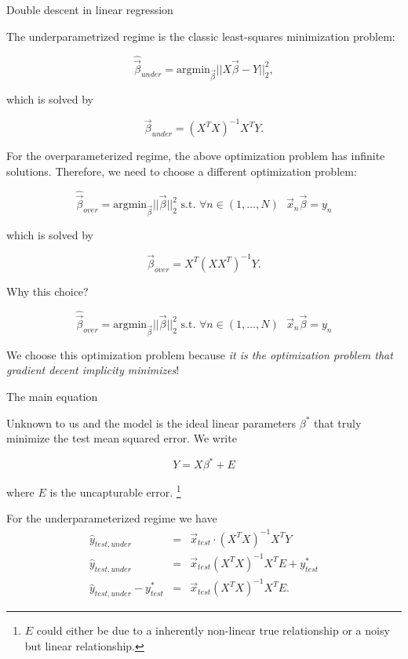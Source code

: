 \documentclass{beamer}
\begin{document}
\begin{frame}{Double descent in linear regression}

    The underparametrized regime is the classic least-squares minimization problem:

    $$\hat{\vec{\beta}}_{under} = \text{arg} \text{min}_{\vec{\beta}}||X \vec{\beta} - Y||^2_2, $$

    which is solved by

    $$\vec{\beta}_{under} = (X^T X)^{-1} X^T Y.$$

    \pause

    For the overparameterized regime, the above optimization problem has infinite solutions. Therefore, we need to choose a different optimization problem:

    $$\hat{\vec{\beta}}_{over} = \text{arg} \text{min}_{\vec{\beta}}||\vec{\beta}||^2_2 \text{   s.t.   } \forall n \in (1,\dots,N) \text{   } \vec{x}_n \vec{\beta} = y_n$$

    which is solved by

    $$\vec{\beta}_{over} = X^T (X X^T)^{-1}Y.$$

\end{frame}


\begin{frame}{Why this choice?}

    $$\hat{\vec{\beta}}_{over} = \text{arg} \text{min}_{\vec{\beta}}||\vec{\beta}||^2_2 \text{   s.t.   } \forall n \in (1,\dots,N) \text{   } \vec{x}_n \vec{\beta} = y_n$$

    \hspace{5cm}

    We choose this optimization problem because \emph{it is the optimization problem that gradient decent implicity minimizes}!
    
\end{frame}

\begin{frame}{The main equation}

    Unknown to us and the model is the ideal linear parameters $\beta^*$ that truly minimize the test mean squared error. We write 

    $$Y=X\beta^* + E$$

    where $E$ is the uncapturable error. \footnote{$E$ could either be due to a inherently non-linear true relationship or a noisy but linear relationship.}

    \pause

    For the underparameterized regime we have
    \begin{eqnarray*}
        \hat{y}_{test,under} & = & \vec{x}_{test} \cdot (X^T X)^{-1}X^T Y \\
        \hat{y}_{test,under} & = & \vec{x}_{test} (X^T X)^{-1} X^T E  + y^*_{test} \\
        \hat{y}_{test,under} - y^*_{test} & = & \vec{x}_{test} (X^T X)^{-1} X^T E.
    \end{eqnarray*}

\end{frame}
\end{document}
